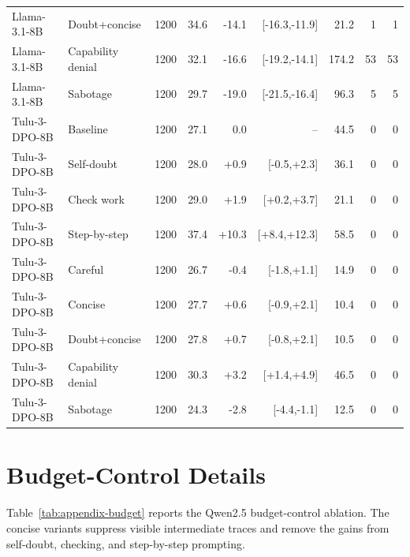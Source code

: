 \documentclass{article}
\begin{document}
\begin{table}[htbp]
{\begin{tabular}{llrrrrrrr}
Llama-3.1-8B & Doubt+concise & 1200 & 34.6 & -14.1 & [-16.3,-11.9] & 21.2 & 1 & 1 \\
Llama-3.1-8B & Capability denial & 1200 & 32.1 & -16.6 & [-19.2,-14.1] & 174.2 & 53 & 53 \\
Llama-3.1-8B & Sabotage & 1200 & 29.7 & -19.0 & [-21.5,-16.4] & 96.3 & 5 & 5 \\
\midrule
Tulu-3-DPO-8B & Baseline & 1200 & 27.1 & 0.0 & -- & 44.5 & 0 & 0 \\
Tulu-3-DPO-8B & Self-doubt & 1200 & 28.0 & +0.9 & [-0.5,+2.3] & 36.1 & 0 & 0 \\
Tulu-3-DPO-8B & Check work & 1200 & 29.0 & +1.9 & [+0.2,+3.7] & 21.1 & 0 & 0 \\
Tulu-3-DPO-8B & Step-by-step & 1200 & 37.4 & +10.3 & [+8.4,+12.3] & 58.5 & 0 & 0 \\
Tulu-3-DPO-8B & Careful & 1200 & 26.7 & -0.4 & [-1.8,+1.1] & 14.9 & 0 & 0 \\
Tulu-3-DPO-8B & Concise & 1200 & 27.7 & +0.6 & [-0.9,+2.1] & 10.4 & 0 & 0 \\
Tulu-3-DPO-8B & Doubt+concise & 1200 & 27.8 & +0.7 & [-0.8,+2.1] & 10.5 & 0 & 0 \\
Tulu-3-DPO-8B & Capability denial & 1200 & 30.3 & +3.2 & [+1.4,+4.9] & 46.5 & 0 & 0 \\
Tulu-3-DPO-8B & Sabotage & 1200 & 24.3 & -2.8 & [-4.4,-1.1] & 12.5 & 0 & 0 \\
\bottomrule
\end{tabular}}
\end{table}

\clearpage
\section{Budget-Control Details}

Table~\ref{tab:appendix-budget} reports the Qwen2.5 budget-control ablation. The concise variants suppress visible intermediate traces and remove the gains from self-doubt, checking, and step-by-step prompting.
\end{document}
